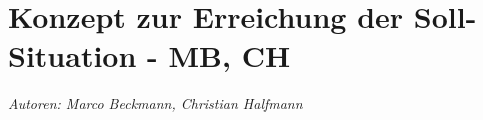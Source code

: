 \chapter{Konzept zur Erreichung der Soll-Situation - MB, CH}

\textit{Autoren: Marco Beckmann, Christian Halfmann}







